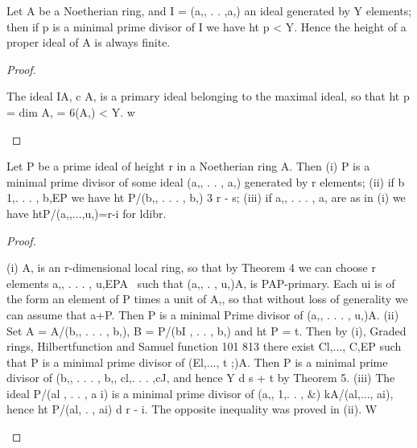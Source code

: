 \begin{theorem}[Theorem 13.5]\label{mcrt-auto-theorem-13-5}\uses{}
\begin{mathematicalrecord}
Let A be a Noetherian ring, and I = (a,, . . ,a,) an ideal
generated by Y elements; then if p is a minimal prime divisor of I we have
ht p < Y. Hence the height of a proper ideal of A is always finite.
\end{mathematicalrecord}
\end{theorem}
\begin{proof}
\begin{mathematicalrecord}
The ideal IA, c A, is a primary ideal belonging to the maximal
ideal, so that ht p = dim A, = 6(A,) < Y. w
\end{mathematicalrecord}
\end{proof}


\begin{theorem}[Theorem 13.6]\label{mcrt-auto-theorem-13-6}\uses{}
\begin{mathematicalrecord}
Let P be a prime ideal of height r in a Noetherian ring A.
Then
   (i) P is a minimal prime divisor of some ideal (a,, . . , a,) generated by
r elements;
   (ii) if b 1,. . . , b,EP we have ht P/(b,, . . . , b,) 3 r - s;
   (iii) if a,, . . . , a, are as in (i) we have
            htP/(a,,...,u,)=r-i            for ldibr.
\end{mathematicalrecord}
\end{theorem}
\begin{proof}
\begin{mathematicalrecord}
(i) A, is an r-dimensional local ring, so that by Theorem 4 we can
choose r elements a,, . . . , u,EPA~ such that (a,, . , u,)A, is PAP-primary.
Each ui is of the form an element of P times a unit of A,, so that without
loss of generality we can assume that a+P. Then P is a minimal Prime
divisor of (a,, . . . , u,)A.
   (ii) Set A = A/(b,, . . . , b,), B = P/(bI , . . , b,) and ht P = t. Then by (i),
                 Graded rings, Hilbertfunction     and Samuel function                   101
     813
     there   exist   Cl,..., C,EP    such that P is a minimal prime divisor of
     (El,..., t ;)A. Then    P  is a  minimal prime divisor of (b,, . . . , b,, cl,. . . ,cJ,
     and hence Y d s + t by Theorem 5.
        (iii) The ideal P/(al , . . , a i) is a minimal prime divisor of (a,, 1,. . , &)
     kA/(al,...,     ai), hence ht P/(al, . , ai) d r - i. The opposite inequality was
     proved in (ii). W
\end{mathematicalrecord}
\end{proof}


